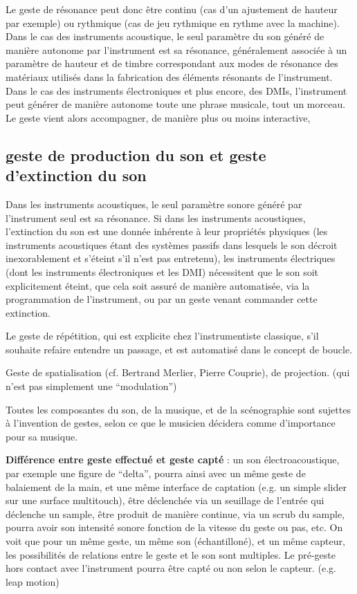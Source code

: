 Le geste de résonance peut donc être continu (cas d'un ajustement de hauteur par exemple) ou rythmique (cas de jeu rythmique en rythme avec la machine).
Dans le cas des instruments acoustique, le seul paramètre du son généré de manière autonome par l'instrument est sa résonance, généralement associée à un paramètre de hauteur et de timbre correspondant aux modes de résonance des matériaux utilisés dans la fabrication des éléments résonants de l'instrument. Dans le cas des instruments électroniques et plus encore, des \glspl{DMI}, l'instrument peut générer de manière autonome toute une phrase musicale, tout un morceau. Le geste vient alors accompagner, de manière plus ou moins interactive, 

\subsection*{geste de production du son et geste d'extinction du son}

Dans les instruments acoustiques, le seul paramètre sonore généré par l'instrument seul est sa résonance.
Si dans les instruments acoustiques, l'extinction du son est une donnée inhérente à leur propriétés physiques (les instruments acoustiques étant des systèmes passifs dans lesquels le son décroit inexorablement et s'éteint s'il n'est pas entretenu), les instruments électriques (dont les instruments électroniques et les \gls{DMI}) nécessitent que le son soit explicitement éteint, que cela soit assuré de manière automatisée, via la programmation de l'instrument, ou par un geste venant commander cette extinction.

Le geste de répétition, qui est explicite chez l'instrumentiste classique, s'il souhaite refaire entendre un passage, et est automatisé dans le concept de boucle.

Geste de spatialisation (cf. Bertrand Merlier, Pierre Couprie), de projection. (qui n'est pas simplement une ``modulation'')

Toutes les composantes du son, de la musique, et de la scénographie sont sujettes à l'invention de gestes, selon ce que le musicien décidera comme d'importance pour sa musique.

\textbf{Différence entre geste effectué et geste capté} : un son électroacoustique, par exemple une figure de ``delta'', pourra ainsi avec un même geste de balaiement de la main, et une même interface de captation (e.g. un simple slider sur une surface multitouch), être déclenchée via un seuillage de l'entrée qui déclenche un sample, être produit de manière continue, via un scrub du sample, pourra avoir son intensité sonore fonction de la vitesse du geste ou pas, etc. On voit que pour un même geste, un même son (échantilloné), et un même capteur, les possibilités de relations entre le geste et le son sont multiples. Le pré-geste hors contact avec l'instrument pourra être capté ou non selon le capteur. (e.g. leap motion)









